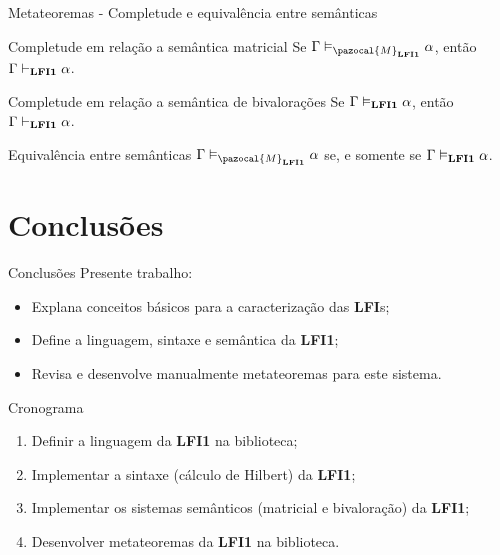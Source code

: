 \documentclass[xcolor=table]{beamer}
\newcommand{\lfium}{{\normalfont\textbf{LFI1}}}
\newcommand{\lfis}{{\normalfont\textbf{LFI}s}}
\newcommand{\conmat}{\vDash_{\pazocal{M}_{\lfium{}}}}
\newcommand{\conval}{\vDash_{\lfium{}}}
\newcommand{\conhil}{\vdash_{\lfium{}}}
\begin{document}
    \begin{frame}{Metateoremas {-} Completude e equivalência entre semânticas}
        \begin{block}{Completude em relação a semântica matricial}
            Se $\Gamma \conmat \alpha$, então $\Gamma \conhil \alpha$.
        \end{block}

        \begin{block}{Completude em relação a semântica de bivalorações}
           Se $\Gamma \conval \alpha$, então $\Gamma \conhil \alpha$.
        \end{block}

        \begin{block}{Equivalência entre semânticas}
            $\Gamma \conmat \alpha$ se, e somente se $\Gamma \conval \alpha$.
        \end{block}
    \end{frame}
        

\section[]{Conclusões}
    
    \begin{frame}{Conclusões}
        Presente trabalho:
        \begin{itemize}
            \item Explana conceitos básicos para a caracterização das \lfis{};
            \item Define a linguagem, sintaxe e semântica da \lfium{};
            \item Revisa e desenvolve manualmente metateoremas para este sistema.
        \end{itemize}
    \end{frame}

    \begin{frame}{Cronograma}
        \begin{enumerate}
            \item Definir a linguagem da \lfium{} na biblioteca;
            \item Implementar a sintaxe (cálculo de Hilbert) da \lfium{};
            \item Implementar os sistemas semânticos (matricial e bivaloração) da \lfium{};
            \item Desenvolver metateoremas da \lfium{} na biblioteca.
        \end{enumerate}
    \end{frame}
\end{document}
